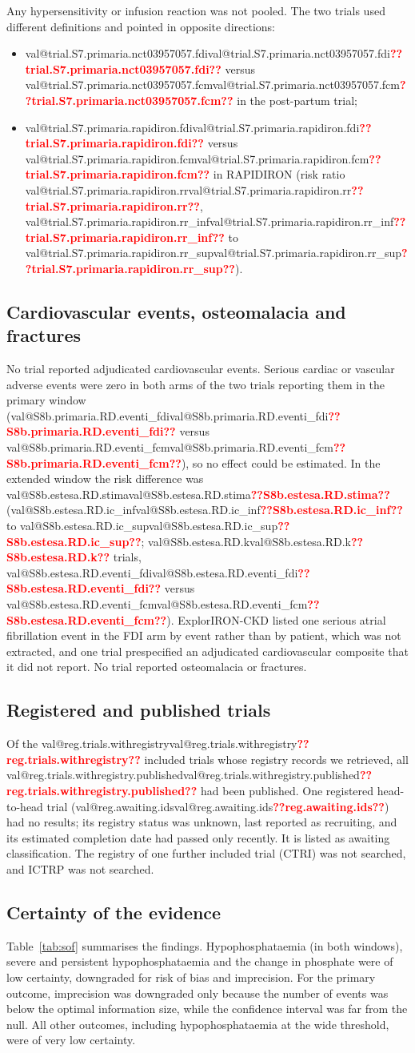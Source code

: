 \documentclass[11pt,a4paper]{article}
\makeatletter
\newcommand{\val}[1]{\ifcsname val@#1\endcsname\csname val@#1\endcsname\else\textbf{\textcolor{red}{??#1??}}\fi}
\makeatother
\begin{document}
Any hypersensitivity or infusion reaction was not pooled. The two trials used different definitions and pointed in opposite directions:
\begin{itemize}
\item \val{trial.S7.primaria.nct03957057.fdi} versus \val{trial.S7.primaria.nct03957057.fcm} in the post-partum trial;
\item \val{trial.S7.primaria.rapidiron.fdi} versus \val{trial.S7.primaria.rapidiron.fcm} in RAPIDIRON (risk ratio \val{trial.S7.primaria.rapidiron.rr}, \val{trial.S7.primaria.rapidiron.rr_inf} to \val{trial.S7.primaria.rapidiron.rr_sup}).
\end{itemize}

\subsection{Cardiovascular events, osteomalacia and fractures}
No trial reported adjudicated cardiovascular events. Serious cardiac or vascular adverse events were zero in both arms of the two trials reporting them in the primary window (\val{S8b.primaria.RD.eventi_fdi} versus \val{S8b.primaria.RD.eventi_fcm}), so no effect could be estimated. In the extended window the risk difference was \val{S8b.estesa.RD.stima} (\val{S8b.estesa.RD.ic_inf} to \val{S8b.estesa.RD.ic_sup}; \val{S8b.estesa.RD.k} trials, \val{S8b.estesa.RD.eventi_fdi} versus \val{S8b.estesa.RD.eventi_fcm}). ExplorIRON-CKD listed one serious atrial fibrillation event in the FDI arm by event rather than by patient, which was not extracted, and one trial prespecified an adjudicated cardiovascular composite that it did not report. No trial reported osteomalacia or fractures.

\subsection{Registered and published trials}
Of the \val{reg.trials.withregistry} included trials whose registry records we retrieved, all \val{reg.trials.withregistry.published} had been published. One registered head-to-head trial (\val{reg.awaiting.ids}) had no results; its registry status was unknown, last reported as recruiting, and its estimated completion date had passed only recently. It is listed as awaiting classification. The registry of one further included trial (CTRI) was not searched, and ICTRP was not searched.

\subsection{Certainty of the evidence}
Table~\ref{tab:sof} summarises the findings. Hypophosphataemia (in both windows), severe and persistent hypophosphataemia and the change in phosphate were of low certainty, downgraded for risk of bias and imprecision. For the primary outcome, imprecision was downgraded only because the number of events was below the optimal information size, while the confidence interval was far from the null. All other outcomes, including hypophosphataemia at the wide threshold, were of very low certainty.
\end{document}
